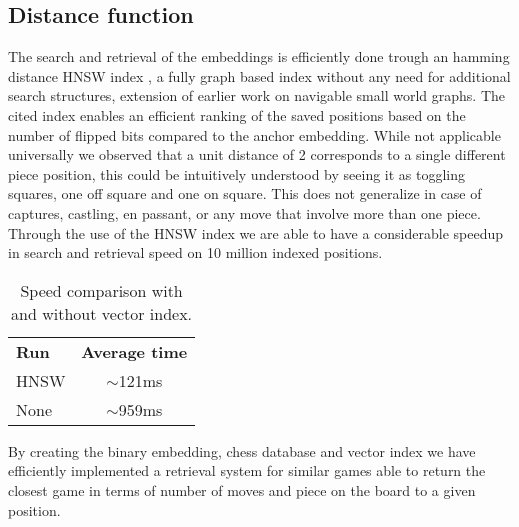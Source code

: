 \subsection{Distance function}
The search and retrieval of the embeddings is efficiently done trough an hamming distance HNSW index \cite{retrieval:hnsw},
a fully graph based index without any need for additional search structures, extension of earlier work on navigable small world graphs. 
\newline
The cited index enables an efficient ranking of the saved positions based on the number of flipped bits compared to the anchor embedding.
\newline
While not applicable universally we observed that a unit distance of 2 corresponds to a single different piece position, 
this could be intuitively understood by seeing it as toggling squares, one off square and one on square. 
\newline %
This does not generalize in case of captures, castling, en passant, or any move that involve more than one piece.
\newline
Through the use of the HNSW index we are able to have a considerable speedup in search and retrieval speed on 10 million indexed positions.
\begin{table}[ht]
\centering
\caption{Speed comparison with and without vector index.}
\label{retrieval:table:vectorindex}
\begin{tabular}{lc}
\textbf{Run} & \textbf{Average time} \\
HNSW & $\sim$121ms \\
None & $\sim$959ms 
\end{tabular}
\end{table}
By creating the binary embedding, chess database and vector index we have efficiently implemented a retrieval system for similar games able to return
the closest game in terms of number of moves and piece on the board to a given position.

